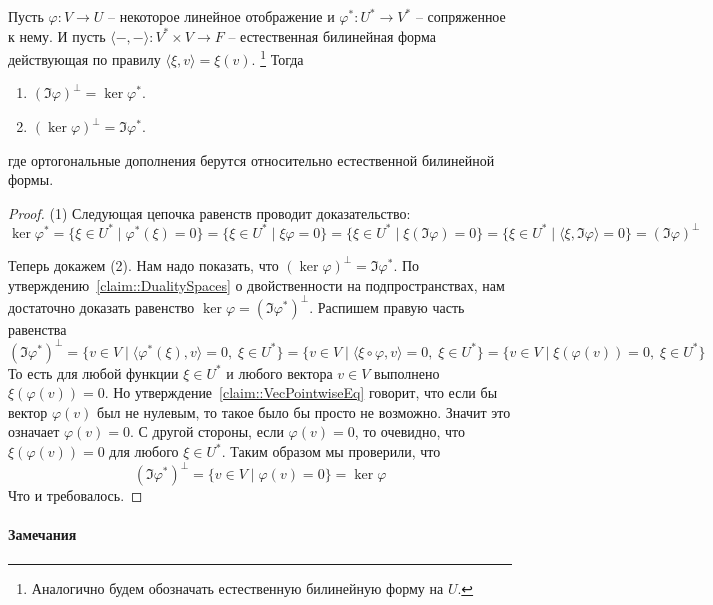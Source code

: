 \begin{claim}
\label{claim::Fredholm}
Пусть $\varphi\colon V\to U$ -- некоторое линейное отображение и $\varphi^*\colon U^*\to V^*$ -- сопряженное к нему.
И пусть $\langle{-},{-}\rangle \colon V^* \times V\to F$ -- естественная билинейная форма действующая по правилу $\langle \xi, v\rangle = \xi(v)$.%
\footnote{Аналогично будем обозначать естественную билинейную форму на $U$.}
Тогда
\begin{enumerate}
\item $(\Im \varphi)^\bot = \ker \varphi^*$.

\item $(\ker \varphi)^\bot = \Im \varphi^*$.
\end{enumerate}
где ортогональные дополнения берутся относительно естественной билинейной формы.
\end{claim}
\begin{proof}
(1) Следующая цепочка равенств проводит доказательство:
\[
\ker\varphi^* =\{\xi \in U^*\mid \varphi^*(\xi) = 0\} = \{\xi \in U^*\mid \xi \varphi = 0\} = \{\xi\in U^*\mid \xi(\Im \varphi) = 0\} = \{\xi\in U^*\mid \langle \xi, \Im\varphi\rangle = 0\} = (\Im \varphi)^\bot
\]

Теперь докажем (2).
Нам надо показать, что $(\ker \varphi)^\bot = \Im \varphi^*$.
По утверждению~\ref{claim::DualitySpaces} о двойственности на подпространствах, нам достаточно доказать равенство $\ker \varphi = (\Im \varphi^*)^\bot$.
Распишем правую часть равенства
\[
(\Im \varphi^*)^\bot = \{v\in V \mid \langle \varphi^*(\xi), v\rangle = 0,\;\xi\in U^*\} = \{v\in V \mid \langle \xi\circ \varphi , v\rangle = 0,\;\xi\in U^*\} = \{v\in V \mid \xi (\varphi (v)) = 0,\;\xi\in U^*\}
\]
То есть для любой функции $\xi\in U^*$ и любого вектора $v\in V$ выполнено $\xi(\varphi(v)) = 0$.
Но утверждение~\ref{claim::VecPointwiseEq} говорит, что если бы вектор $\varphi(v)$ был не нулевым, то такое было бы просто не возможно.
Значит это означает $\varphi(v) = 0$.
С другой стороны, если $\varphi(v) = 0$, то очевидно, что $\xi(\varphi(v)) = 0$ для любого $\xi\in U^*$.
Таким образом мы проверили, что
\[
(\Im \varphi^*)^\bot =  \{v\in V \mid \varphi (v) = 0\} = \ker\varphi
\]
Что и требовалось.
\end{proof}

\paragraph{Замечания}

